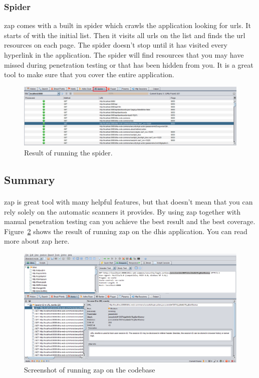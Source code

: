 \documentclass[11pt,english,a4paper]{report}
\begin{document}
\subsubsection{Spider}
\gls{zap} comes with a built in spider which crawls the application looking for \glspl{url}.
It starts of with the initial list. 
Then it visits all \glspl{url} on the list and finds the \gls{url} resources on each page. 
The spider doesn't stop until it has visited every hyperlink in the application.
The spider will find resources that you may have missed during penetration testing or that has been hidden from you. 
It is a great tool to make sure that you cover the entire application.

\begin{figure}[h]
    \centering
    \includegraphics[scale=0.35]{images/zap-spider.png}
    \caption{Result of running the spider. }
    \label{fig:zapspider}
\end{figure}

\subsection{Summary}
\paragraph{}
\gls{zap} is great tool with many helpful features, but that doesn't mean that you can rely solely on the automatic scanners it provides. 
By using \gls{zap} together with manual penetration testing can you achieve the best result and the best coverage. 
Figure~\ref{fig:zapscreenshot}  shows the result of running \gls{zap} on the \gls{dhis} application. You can read more about \gls{zap} here. \cite{zap-documentation,zap-homepage}


\begin{figure}[h]
    \centering
    \includegraphics[scale=0.35]{images/zap-sc.png}
    \caption{Screenshot of running \gls{zap} on the codebase}
    \label{fig:zapscreenshot}
\end{figure}
\end{document}
